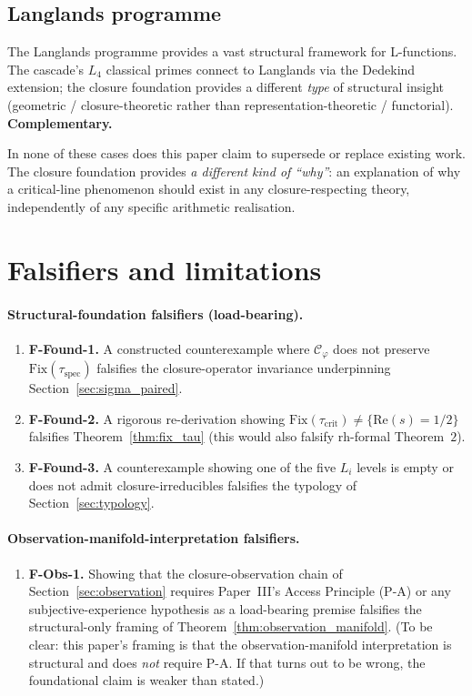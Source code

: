 \documentclass[11pt,a4paper]{article}
\theoremstyle{definition}
\theoremstyle{remark}
\begin{document}
\subsection{Langlands programme}
The Langlands programme provides a vast structural framework for
L-functions. The cascade's $L_4$ classical primes connect to Langlands
via the Dedekind extension; the closure foundation provides a different
\emph{type} of structural insight (geometric / closure-theoretic rather
than representation-theoretic / functorial). \textbf{Complementary.}

In none of these cases does this paper claim to supersede or replace
existing work. The closure foundation provides \emph{a different kind of
``why''}: an explanation of why a critical-line phenomenon should exist
in any closure-respecting theory, independently of any specific arithmetic
realisation.

\section{Falsifiers and limitations}\label{sec:falsifiers}

\paragraph{Structural-foundation falsifiers (load-bearing).}
\begin{enumerate}\itemsep0pt
  \item \textbf{F-Found-1.} A constructed counterexample where $\mathcal{C}_\varphi$ does not preserve $\mathrm{Fix}(\tau_{\mathrm{spec}})$ falsifies the closure-operator invariance underpinning Section~\ref{sec:sigma_paired}.
  \item \textbf{F-Found-2.} A rigorous re-derivation showing $\mathrm{Fix}(\tau_{\mathrm{crit}}) \neq \{\mathrm{Re}(s) = 1/2\}$ falsifies Theorem~\ref{thm:fix_tau} (this would also falsify rh-formal Theorem~$2$).
  \item \textbf{F-Found-3.} A counterexample showing one of the five $L_i$ levels is empty or does not admit closure-irreducibles falsifies the typology of Section~\ref{sec:typology}.
\end{enumerate}

\paragraph{Observation-manifold-interpretation falsifiers.}
\begin{enumerate}\itemsep0pt\setcounter{enumi}{3}
  \item \textbf{F-Obs-1.} Showing that the closure-observation chain of Section~\ref{sec:observation} requires Paper~III's Access Principle (P-A) or any subjective-experience hypothesis as a load-bearing premise falsifies the structural-only framing of Theorem~\ref{thm:observation_manifold}. (To be clear: this paper's framing is that the observation-manifold interpretation is structural and does \emph{not} require P-A. If that turns out to be wrong, the foundational claim is weaker than stated.)
\end{enumerate}
\end{document}
